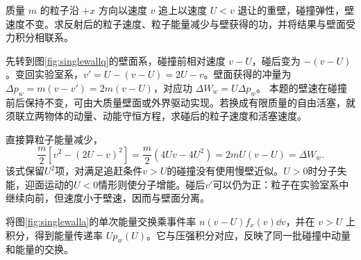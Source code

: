 \begin{example}[运动镜面的单次碰撞能量交换]
质量 $m$ 的粒子沿 $+x$ 方向以速度 $v$ 追上以速度 $U<v$ 退让的重壁，碰撞弹性，壁速度不变。求反射后的粒子速度、粒子能量减少与壁获得的功，并将结果与壁面受力积分相联系。
\end{example}
\begin{solution}
先转到图\ref{fig:singlewallq}的壁面系，碰撞前相对速度 $v-U$，碰后变为 $-(v-U)$。变回实验室系，$v'=U-(v-U)=2U-v$。壁面获得的冲量为 $\Delta p_w=m(v-v')=2m(v-U)$，对应功 $\Delta W_w=U\Delta p_w$。
本题的壁速在碰撞前后保持不变，可由大质量壁面或外界驱动实现。若换成有限质量的自由活塞，就须联立两物体的动量、动能守恒方程，求碰后的粒子速度和活塞速度。

直接算粒子能量减少，
\[
 \frac m2[v^2-(2U-v)^2]
 =\frac m2(4Uv-4U^2)=2mU(v-U)=\Delta W_w.
\]
该式保留$U^2$项，对满足追赶条件$v>U$的碰撞没有使用慢壁近似。$U>0$时分子失能，迎面运动的$U<0$情形则使分子增能。碰后$v'$可以仍为正：粒子在实验室系中继续向前，但速度小于壁速，因而与壁面分离。

将图\ref{fig:singlewalla}的单次能量交换乘事件率 $n(v-U)f_x(v)\dd v$，并在 $v>U$ 上积分，得到能量传递率 $Up_w(U)$。它与压强积分对应，反映了同一批碰撞中动量和能量的交换。
\end{solution}

